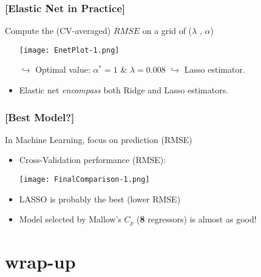 \documentclass[xcolor=x11names,compress, aspectratio=169]{beamer}
\renewcommand{\(}{\begin{columns}}
\renewcommand{\)}{\end{columns}}
\newcommand{\<}[1]{\begin{column}{#1}}
\renewcommand{\>}{\end{column}}
\begin{document}
\begin{frame} %
\frametitle{\textcolor{brique}{[Elastic Net in Practice]}}
Compute the (CV-averaged) $RMSE$ on a  grid of ($\lambda$ , $\alpha$)
\pause
\begin{itemize}[<+->]
\item[]  \texttt{[image: EnetPlot-1.png]}
\item[$\hookrightarrow$] Optimal value: $\alpha^* = 1$  \& $\lambda  = 0.008$  $\hookrightarrow$ Lasso estimator.
\item Elastic net \emph{encompass} both Ridge and Lasso estimators.
\end{itemize}
\end{frame}



\begin{frame} %
\frametitle{\textcolor{brique}{[Best Model?]}}
In Machine Learning, focus on prediction  (RMSE)
\pause
\begin{itemize}[<+->]
\item Cross-Validation performance (RMSE):
\item[] \texttt{[image: FinalComparison-1.png]}
\item LASSO is probably the best (lower RMSE)
\item Model selected by Mallow's $C_p$  (\textbf{8} regressors) is almost as good!
\end{itemize}
\end{frame}

\section{wrap-up}
\end{document}
